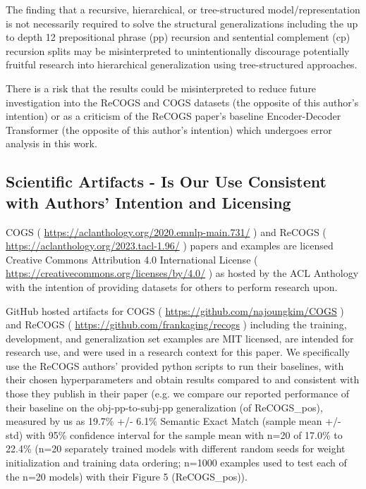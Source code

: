 \documentclass[11pt]{article}
\begin{document}
The finding that a recursive, hierarchical, or tree-structured model/representation is not necessarily required to solve the structural generalizations including the up to depth 12 prepositional phrase (pp) recursion and sentential complement (cp) recursion splits may be misinterpreted to unintentionally discourage potentially fruitful research into hierarchical generalization using tree-structured approaches.

There is a risk that the results could be misinterpreted to reduce future investigation into the ReCOGS and COGS datasets (the opposite of this author’s intention) or as a criticism of the ReCOGS paper's baseline Encoder-Decoder Transformer (the opposite of this author's intention) which undergoes error analysis in this work.

\subsection{Scientific Artifacts - Is Our Use Consistent with Authors' Intention and Licensing}
\label{scientific_artifacts_use}

COGS \cite{KimLinzen2020} ( \href{https://aclanthology.org/2020.emnlp-main.731/}{https://aclanthology.org/2020.emnlp-main.731/} ) and ReCOGS \cite{Wu2023} ( \href{https://aclanthology.org/2023.tacl-1.96/}{https://aclanthology.org/2023.tacl-1.96/} ) papers and examples are licensed Creative Commons Attribution 4.0 International License ( \href{https://creativecommons.org/licenses/by/4.0/}{https://creativecommons.org/licenses/by/4.0/} ) as hosted by the ACL Anthology with the intention of providing datasets for others to perform research upon. 

GitHub hosted artifacts for COGS ( \href{https://github.com/najoungkim/COGS}{https://github.com/najoungkim/COGS}  ) and ReCOGS ( \href{https://github.com/frankaging/recogs}{https://github.com/frankaging/recogs} ) including the training, development, and generalization set examples are MIT licensed, are intended for research use, and were used in a research context for this paper. We specifically use the ReCOGS authors' provided python scripts to run their baselines, with their chosen hyperparameters and obtain results compared to and consistent with those they publish in their paper (e.g. we compare our reported performance of their baseline on the obj-pp-to-subj-pp generalization (of ReCOGS\_pos), measured by us as 19.7\% +/- 6.1\% Semantic Exact Match (sample mean +/- std) with 95\% confidence interval for the sample mean with n=20 of 17.0\% to 22.4\% (n=20 separately trained models with different random seeds for weight initialization and training data ordering; n=1000 examples used to test each of the n=20 models) with their Figure 5 (ReCOGS\_pos)).
\end{document}
